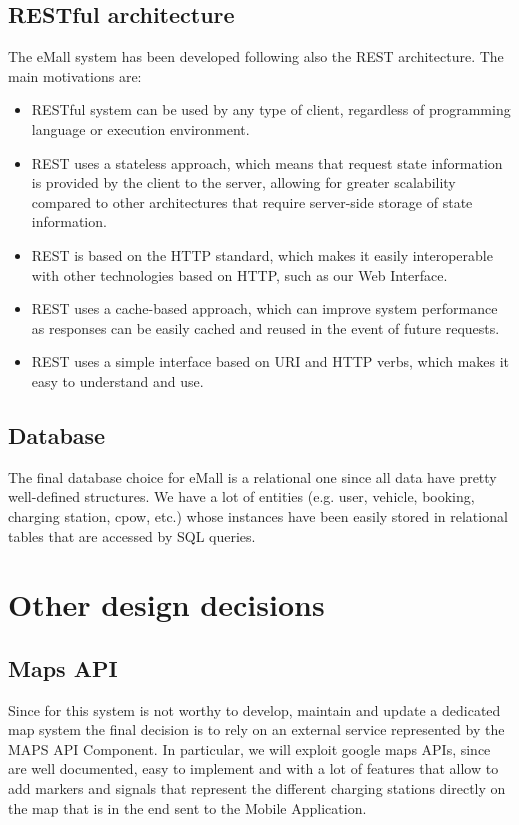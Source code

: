 \documentclass[a4paper]{report}
\begin{document}
\subsection{RESTful architecture}
The eMall system has been developed following also the REST architecture. The main motivations are:
\begin{itemize}
    \item RESTful system can be used by any type of client, regardless of programming language or execution environment.
    \item REST uses a stateless approach, which means that request state information is provided by the client to the server, allowing for greater scalability compared to other architectures that require server-side storage of state information.
    \item REST is based on the HTTP standard, which makes it easily interoperable with other technologies based on HTTP, such as our Web Interface.
    \item REST uses a cache-based approach, which can improve system performance as responses can be easily cached and reused in the event of future requests.
    \item REST uses a simple interface based on URI and HTTP verbs, which makes it easy to understand and use.
\end{itemize}

\subsection{Database}
The final database choice for eMall is a relational one since all data have pretty well-defined structures. We have a lot of entities (e.g. user, vehicle, booking, charging station, cpow, etc.) whose instances have been easily stored in relational tables that are accessed by SQL queries.

\section{Other design decisions}

\subsection{Maps API}
Since for this system is not worthy to develop, maintain and update a dedicated map system the final decision is to rely on an external service represented by the MAPS API Component. In particular, we will exploit google maps APIs, since are well documented, easy to implement and with a lot of features that allow to add markers and signals that represent the different charging stations directly on the map that is in the end sent to the Mobile Application.
\end{document}
